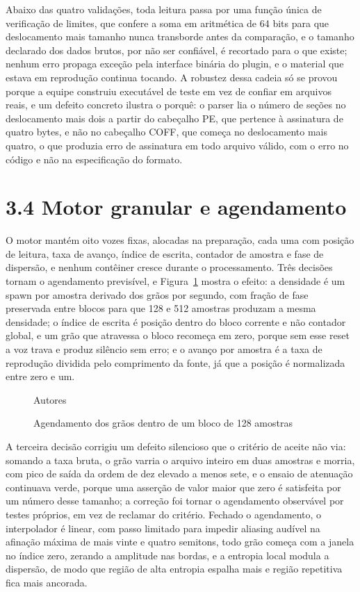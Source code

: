 \documentclass[11pt,a4paper]{article}
\begin{document}
Abaixo das quatro validações, toda leitura passa por uma função única de verificação de limites, que confere a soma em aritmética de 64 bits para que deslocamento mais tamanho nunca transborde antes da comparação, e o tamanho declarado dos dados brutos, por não ser confiável, é recortado para o que existe; nenhum erro propaga exceção pela interface binária do plugin, e o material que estava em reprodução continua tocando. A robustez dessa cadeia só se provou porque a equipe construiu executável de teste em vez de confiar em arquivos reais, e um defeito concreto ilustra o porquê: o parser lia o número de seções no deslocamento mais dois a partir do cabeçalho PE, que pertence à assinatura de quatro bytes, e não no cabeçalho COFF, que começa no deslocamento mais quatro, o que produzia erro de assinatura em todo arquivo válido, com o erro no código e não na especificação do formato.


\section*{3.4 Motor granular e agendamento}

O motor mantém oito vozes fixas, alocadas na preparação, cada uma com posição de leitura, taxa de avanço, índice de escrita, contador de amostra e fase de dispersão, e nenhum contêiner cresce durante o processamento. Três decisões tornam o agendamento previsível, e Figura~\ref{fig:agendamento} mostra o efeito: a densidade é um spawn por amostra derivado dos grãos por segundo, com fração de fase preservada entre blocos para que 128 e 512 amostras produzam a mesma densidade; o índice de escrita é posição dentro do bloco corrente e não contador global, e um grão que atravessa o bloco recomeça em zero, porque sem esse reset a voz trava e produz silêncio sem erro; e o avanço por amostra é a taxa de reprodução dividida pelo comprimento da fonte, já que a posição é normalizada entre zero e um.


\begin{figure}
\centering
\resizebox{0.92\textwidth}{!}{}
\caption{Agendamento dos grãos dentro de um bloco de 128 amostras}
\label{fig:agendamento}
{\footnotesize Autores\par}
\end{figure}

A terceira decisão corrigiu um defeito silencioso que o critério de aceite não via: somando a taxa bruta, o grão varria o arquivo inteiro em duas amostras e morria, com pico de saída da ordem de dez elevado a menos sete, e o ensaio de atenuação continuava verde, porque uma asserção de valor maior que zero é satisfeita por um número desse tamanho; a correção foi tornar o agendamento observável por testes próprios, em vez de reclamar do critério. Fechado o agendamento, o interpolador é linear, com passo limitado para impedir aliasing audível na afinação máxima de mais vinte e quatro semitons, todo grão começa com a janela no índice zero, zerando a amplitude nas bordas, e a entropia local modula a dispersão, de modo que região de alta entropia espalha mais e região repetitiva fica mais ancorada.
\end{document}
